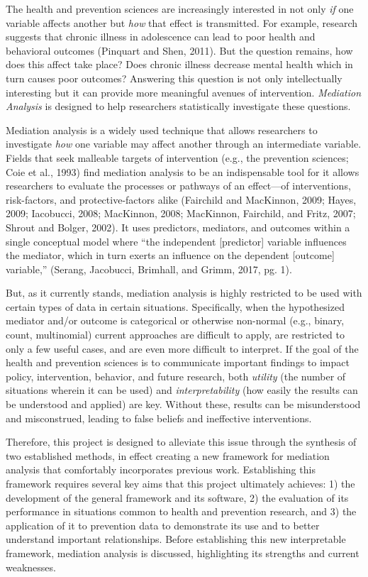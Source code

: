\documentclass[]{DissertateUSU}
\begin{document}
The health and prevention sciences are increasingly interested in not
only \emph{if} one variable affects another but \emph{how} that effect
is transmitted. For example, research suggests that chronic illness in
adolescence can lead to poor health and behavioral outcomes (Pinquart
and Shen, 2011). But the question remains, how does this affect take
place? Does chronic illness decrease mental health which in turn causes
poor outcomes? Answering this question is not only intellectually
interesting but it can provide more meaningful avenues of intervention.
\emph{Mediation Analysis} is designed to help researchers statistically
investigate these questions.

Mediation analysis is a widely used technique that allows researchers to
investigate \emph{how} one variable may affect another through an
intermediate variable. Fields that seek malleable targets of
intervention (e.g., the prevention sciences; Coie et al., 1993) find
mediation analysis to be an indispensable tool for it allows researchers
to evaluate the processes or pathways of an effect---of interventions,
risk-factors, and protective-factors alike (Fairchild and MacKinnon,
2009; Hayes, 2009; Iacobucci, 2008; MacKinnon, 2008; MacKinnon,
Fairchild, and Fritz, 2007; Shrout and Bolger, 2002). It uses
predictors, mediators, and outcomes within a single conceptual model
where ``the independent {[}predictor{]} variable influences the
mediator, which in turn exerts an influence on the dependent
{[}outcome{]} variable,'' (Serang, Jacobucci, Brimhall, and Grimm, 2017,
pg. 1).

But, as it currently stands, mediation analysis is highly restricted to
be used with certain types of data in certain situations. Specifically,
when the hypothesized mediator and/or outcome is categorical or
otherwise non-normal (e.g., binary, count, multinomial) current
approaches are difficult to apply, are restricted to only a few useful
cases, and are even more difficult to interpret. If the goal of the
health and prevention sciences is to communicate important findings to
impact policy, intervention, behavior, and future research, both
\emph{utility} (the number of situations wherein it can be used) and
\emph{interpretability} (how easily the results can be understood and
applied) are key. Without these, results can be misunderstood and
misconstrued, leading to false beliefs and ineffective interventions.

Therefore, this project is designed to alleviate this issue through the
synthesis of two established methods, in effect creating a new framework
for mediation analysis that comfortably incorporates previous work.
Establishing this framework requires several key aims that this project
ultimately achieves: 1) the development of the general framework and its
software, 2) the evaluation of its performance in situations common to
health and prevention research, and 3) the application of it to
prevention data to demonstrate its use and to better understand
important relationships. Before establishing this new interpretable
framework, mediation analysis is discussed, highlighting its strengths
and current weaknesses.
\end{document}
